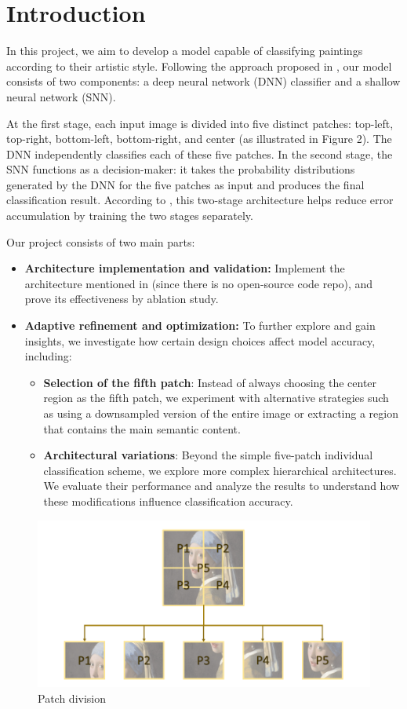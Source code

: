 \section{Introduction}
\label{sec:intro}
In this project, we aim to develop a model capable of classifying paintings according to their artistic style. Following the approach proposed in \cite{imran2023artistic}, our model consists of two components: a deep neural network (DNN) classifier and a shallow neural network (SNN).

At the first stage, each input image is divided into five distinct patches:
top-left, top-right, bottom-left, bottom-right, and center (as illustrated in
Figure 2). The DNN independently classifies each of these five patches. In the
second stage, the SNN functions as a decision-maker: it takes the probability
distributions generated by the DNN for the five patches as input and produces
the final classification result. According to \cite{imran2023artistic}, this
two-stage architecture helps reduce error accumulation by training the two
stages separately.

Our project consists of two main parts:
\begin{itemize}
  \item \textbf{Architecture implementation and validation:} Implement the architecture mentioned in \cite{imran2023artistic} (since there is no open-source code repo), and prove its effectiveness by ablation study.
  \item \textbf{Adaptive refinement and optimization:} To further explore and gain insights, we investigate how certain design choices affect model accuracy, including:
        \begin{itemize}
          \item \textbf{Selection of the fifth patch}: Instead of always choosing the center region as the fifth patch, we experiment with alternative strategies such as using a downsampled version of the entire image or extracting a region that contains the main semantic content.
          \item \textbf{Architectural variations}: Beyond the simple five-patch individual classification scheme, we explore more complex hierarchical architectures. We evaluate their performance and analyze the results to understand how these modifications influence classification accuracy.
        \end{itemize}
\end{itemize}
\begin{figure}[h]

  \centering
  \includegraphics[scale=1,keepaspectratio,width=.5\textwidth]{patch.png}
  \caption{Patch division}
  \label{fig:main_pipeline}
\end{figure}
